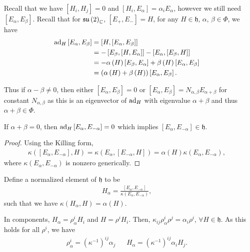 
Recall that we have $\left[ H_{i}, H_{j} \right] = 0$ and $\left[ H_{i}, E_\alpha \right] = \alpha_i E_\alpha$, however we still need $\left[ E_\alpha, E_\beta \right] $. Recall that for $\mathfrak{su}\left( 2 \right)_{\mathbb{C}}$, $\left[ E_+, E_- \right] = H$, for any $H \in \mathfrak{h}$, $\alpha$, $\beta \in \Phi$, we have
\begin{align}
    \text{ad}_H \left[ E_\alpha, E_\beta \right] &= \left[ H, \left[ E_\alpha, E_\beta \right]  \right]  \\
    &= - \left[ E_\beta, \left[ H, E_\alpha \right]  \right] - \left[ E_\alpha, \left[ E_\beta, H \right]  \right]  \\
    &= -\alpha \left( H \right) \left[ E_\beta, E_\alpha \right] + \beta \left( H \right) \left[ E_\alpha, E_\beta \right]  \\
    &= \left( \alpha \left( H \right) + \beta \left( H \right) \right) \left[ E_\alpha, E_\beta \right] 
.\end{align}

Thus if $\alpha - \beta \neq 0$, then either $\left[ E_\alpha, E_\beta \right] = 0$ or $\left[ E_\alpha, E_\beta \right] = N_{\alpha,\beta} E_{\alpha + \beta}$ for constant $N_{\alpha, \beta}$ as this is an eigenvector of $\text{ad}_H$ with eigenvalue $\alpha + \beta$ and thus $\alpha + \beta \in \Phi$.

If $\alpha + \beta = 0$, then $\text{ad}_H \left[ E_\alpha, E_{-\alpha} \right] = 0$ which implies $\left[ E_\alpha, E_{-\alpha} \right] \in \mathfrak{h}$.
\begin{proof}
    Using the Killing form,
    \begin{align}
        \kappa \left( \left[ E_\alpha, E_{-\alpha} \right] , H \right) = \kappa \left( E_\alpha, \left[ E_{-\alpha}, H \right]  \right)  = \alpha \left( H \right) \kappa \left( E_{\alpha} , E_{-\alpha} \right) 
    ,\end{align}
    where $\kappa \left( E_{\alpha},E_{-\alpha} \right) $ is nonzero generically.
\end{proof}

Define a normalized element of $\mathfrak{h}$ to be
\begin{align}
    H_\alpha = \frac{\left[ E_\alpha, E_{-\alpha} \right] }{\kappa \left( E_\alpha, E_{-\alpha} \right) }
,\end{align}
such that we have $\kappa \left( H_\alpha, H \right) = \alpha \left( H \right) $.

In components, $H_\alpha = \rho_\alpha^{i} H_i$ and $H = \rho^{i} H_i$. Then, $\kappa_{ij} \rho^{i}_{\alpha} \rho^{j} = \alpha_i \rho^{i}$, $\forall H \in \mathfrak{h}$. As this holds for all $\rho^{i}$, we have 
\begin{align}
    \rho_\alpha^{i} = \left( \kappa^{-1} \right)^{ij}\alpha_j && H_\alpha = \left( \kappa^{-1} \right)^{ij} \alpha_i H_j
.\end{align}

